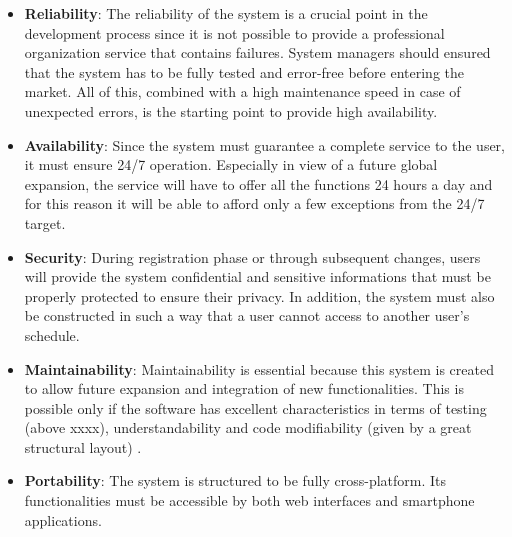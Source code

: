 \begin{itemize}
	\item \textbf{Reliability}: The reliability of the system is a crucial point in the development process since it is not possible to provide a professional organization service that contains failures. System managers should ensured that the system has to be fully tested and error-free before entering the market. All of this, combined with a high maintenance speed in case of unexpected errors, is the starting point to provide high availability.
	\item \textbf{Availability}: Since the system must guarantee a complete service to the user, it must ensure 24/7 operation. Especially in view of a future global expansion, the service will have to offer all the functions 24 hours a day and for this reason it will be able to afford only a few exceptions from the 24/7 target. 
	\item \textbf{Security}: During registration phase or through subsequent changes, users will provide the system confidential and sensitive informations that must be properly protected to ensure their privacy. In addition, the system must also be constructed in such a way that a user cannot access to another user's schedule.
	\item \textbf{Maintainability}: Maintainability is essential because this system is created to allow future expansion and integration of new functionalities. This is possible only if the software has excellent characteristics in terms of testing (above xxxx), understandability and code modifiability (given by a great structural layout) .
	\item \textbf{Portability}: The system is structured to be fully cross-platform. Its functionalities must be accessible by both web interfaces and smartphone applications.
\end{itemize}